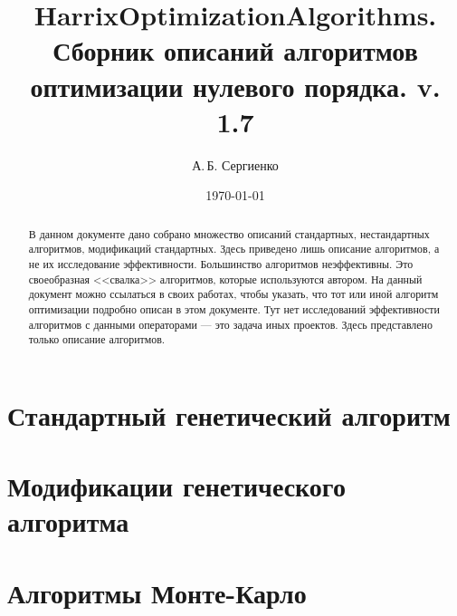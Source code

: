 \documentclass[a4paper,12pt]{article}
\title{HarrixOptimizationAlgorithms. Сборник описаний алгоритмов оптимизации нулевого порядка. v. 1.7}
\author{А.\,Б. Сергиенко}
\date{\today}
\begin{document}


\maketitle

\begin{abstract}
В данном документе дано собрано множество описаний стандартных, нестандартных алгоритмов, модификаций стандартных. Здесь приведено лишь описание алгоритмов, а не их исследование эффективности. Большинство алгоритмов неэффективны. Это своеобразная <<свалка>>  алгоритмов, которые используются автором. На данный документ можно ссылаться в своих работах, чтобы указать, что тот или иной алгоритм оптимизации подробно описан в этом документе. Тут нет исследований эффективности алгоритмов с данными операторами --- это задача иных проектов. Здесь представлено только описание алгоритмов.
\end{abstract}

\tableofcontents

\newpage









\section{Стандартный генетический алгоритм}\label{HarrixOptimizationAlgorithms:GA}




\section{Модификации генетического алгоритма}\label{HarrixOptimizationAlgorithms:ModGA}












\section{Алгоритмы Монте-Карло}\label{HarrixOptimizationAlgorithms:MonteCarlo}




\newpage
\end{document}
